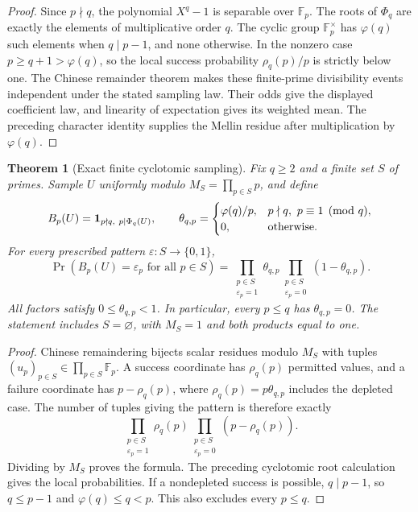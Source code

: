 \documentclass[11pt]{article}
\newtheorem{theorem}{Theorem}[section]
\theoremstyle{definition}
\begin{document}
\begin{proof}
Since $p\nmid q$, the polynomial $X^q-1$ is separable over $\mathbb F_p$.
The roots of $\Phi_q$ are exactly the elements of multiplicative order $q$.
The cyclic group $\mathbb F_p^\times$ has $\varphi(q)$ such elements when
$q\mid p-1$, and none otherwise. In the nonzero case $p\ge q+1>\varphi(q)$,
so the local success probability $\rho_q(p)/p$ is strictly below one.
The Chinese remainder theorem makes these finite-prime divisibility
events independent under the stated sampling law. Their odds give the
displayed coefficient law, and linearity of expectation gives its weighted
mean. The preceding character identity supplies the Mellin residue after
multiplication by $\varphi(q)$.
\end{proof}

\begin{theorem}[Exact finite cyclotomic sampling]
\label{thm:cyclotomic-finite-sampling}
Fix $q\ge2$ and a finite set $S$ of primes. Sample $U$ uniformly modulo
$M_S=\prod_{p\in S}p$, and define
\[
 B_p(U)={\bf1}_{p\nmid q,\ p\mid\Phi_q(U)},\qquad
 \theta_{q,p}=
 \begin{cases}
  \varphi(q)/p,&p\nmid q,\ p\equiv1\pmod q,\\
  0,&\text{otherwise}.
 \end{cases}
\]
For every prescribed pattern $\varepsilon:S\to\{0,1\}$,
\[
 \Pr(B_p(U)=\varepsilon_p\text{ for all }p\in S)
 =
 \prod_{\substack{p\in S\\\varepsilon_p=1}}\theta_{q,p}
 \prod_{\substack{p\in S\\\varepsilon_p=0}}(1-\theta_{q,p}).
\]
All factors satisfy $0\le\theta_{q,p}<1$. In particular, every $p\le q$
has $\theta_{q,p}=0$. The statement includes $S=\varnothing$, with
$M_S=1$ and both products equal to one.
\end{theorem}

\begin{proof}
Chinese remaindering bijects scalar residues modulo $M_S$ with tuples
$(u_p)_{p\in S}\in\prod_{p\in S}\mathbb F_p$. A success coordinate has
$\rho_q(p)$ permitted values, and a failure coordinate has
$p-\rho_q(p)$, where $\rho_q(p)=p\theta_{q,p}$ includes the depleted case.
The number of tuples giving the pattern is therefore exactly
\[
 \prod_{\substack{p\in S\\\varepsilon_p=1}}\rho_q(p)
 \prod_{\substack{p\in S\\\varepsilon_p=0}}(p-\rho_q(p)).
\]
Dividing by $M_S$ proves the formula. The preceding cyclotomic root
calculation gives the local probabilities. If a nondepleted success
is possible, $q\mid p-1$, so $q\le p-1$ and
$\varphi(q)\le q<p$. This also excludes every $p\le q$.
\end{proof}
\end{document}
